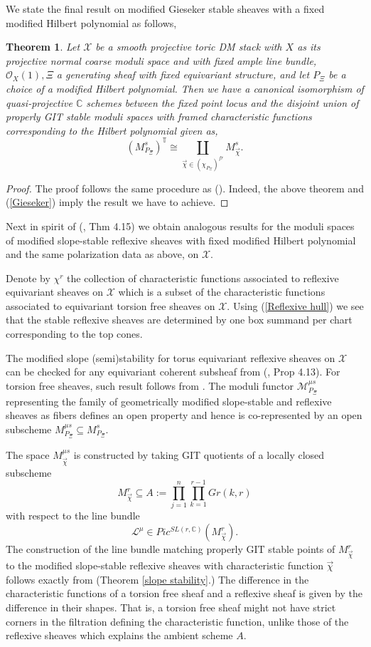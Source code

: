 \documentclass[10pt]{amsart}
\newtheorem{thm}[prop]{Theorem}
\newcommand{\sO}{{\mathcal O}}
\newcommand{\sX}{{\mathcal X}}
\numberwithin{equation}{subsection}
\begin{document}
We state the final result on modified Gieseker stable sheaves with a fixed modified Hilbert polynomial as follows,
\begin{thm}\label{Theorem 4.5}
Let $\sX$ be a smooth projective toric DM stack with $X$ as its projective normal coarse moduli space and with fixed ample line bundle, $\sO_{X}(1),\Xi$ a generating sheaf with fixed equivariant structure, and let $P_{\Xi}$ be a choice of a modified Hilbert polynomial. Then we have a canonical isomorphism of quasi-projective $\mathbb C$ schemes between the fixed point locus and the disjoint union of properly GIT stable moduli spaces with framed characteristic functions corresponding to the Hilbert polynomial given as,
$$(M^{s}_{P_{\Xi}})^{\mathbb T} \cong \coprod \limits_{\vec\chi\in (\chi_{P_{\Xi}})^{fr}}M^{s}_{\vec\chi}.$$
\end{thm}
 \begin{proof}
The proof follows the same procedure as (\cite{Koo2}). Indeed, the above theorem and (\ref{Gieseker}) imply the result we have to achieve.
\end{proof}
Next in spirit of (\cite{Koo2}, Thm 4.15) we obtain analogous results for the moduli spaces of modified slope-stable reflexive sheaves with fixed modified Hilbert polynomial and the same polarization data as above, on $\sX.$\par
Denote by $\chi^r$ the collection of characteristic functions associated to reflexive equivariant sheaves on $\sX$ which is a subset of the characteristic functions associated to equivariant torsion free sheaves on $\sX.$ Using (\ref{Reflexive hull}) we see that the stable reflexive sheaves are determined by one box summand per chart corresponding to the top cones.\par 
The modified slope (semi)stability for torus equivariant reflexive sheaves on $\sX$ can be checked for any equivariant coherent subsheaf from (\cite{Koo2}, Prop 4.13). For torsion free sheaves, such result follows from \cite{BDGP}.
The moduli functor $\mathscr{M}^{\mu s}_{P_{\Xi}}$ representing the family of geometrically modified slope-stable and reflexive sheaves as fibers defines an open property and hence is co-represented by an open subscheme $M^{\mu s}_{P_{\Xi}} \subseteq M^{s}_{P_{\Xi}}.$ \par
The space $M^{\mu s}_{\vec\chi}$ is constructed by taking GIT quotients of
a locally closed subscheme $$M^r_{\vec\chi}\subseteq A:=\prod\limits_{j=1}^{n}\prod\limits_{k=1}^{r-1}Gr(k,r)$$ with respect to the line bundle $$\mathscr{L}^{\mu}\in Pic^{SL(r,\mathbb{C})}(M^r_{\vec\chi}).$$ The construction of the line bundle matching properly GIT stable points of $M^r_{\vec\chi}$ to the modified slope-stable reflexive sheaves with characteristic function $\vec\chi$ follows exactly from (Theorem \ref{slope stability}.) The difference in the characteristic functions of a torsion free sheaf and a reflexive sheaf is given by the difference in their shapes. That is, a torsion free sheaf might not have strict corners in the filtration defining the characteristic function, unlike those of the reflexive sheaves which explains the ambient scheme $A$.\par
\end{document}
